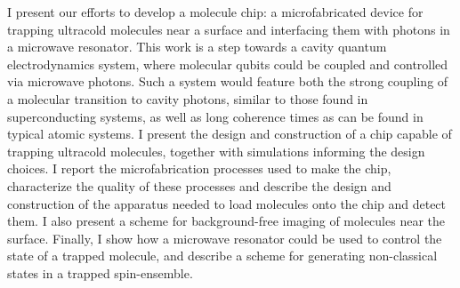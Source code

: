 I present our efforts to develop a molecule chip: a microfabricated device for
trapping ultracold molecules near a surface and interfacing them with photons
in a microwave resonator. This work is a step towards a cavity quantum
electrodynamics system, where molecular qubits could be coupled and controlled
via microwave photons.
%
Such a system would feature both the strong coupling of a molecular transition
to cavity photons, similar to those found in superconducting systems, as well
as long coherence times as can be found in typical atomic systems.
%
I present the design and construction of a chip capable of trapping ultracold
molecules, together with simulations informing the design choices. I report
the microfabrication processes used to make the chip, characterize the quality
of these processes and describe the design and construction of the apparatus
needed to load molecules onto the chip and detect them.
%
I also present a scheme for background-free imaging of molecules near the
surface.  Finally, I show how a microwave resonator could be used to control
the state of a trapped molecule, and describe a scheme for generating
non-classical states in a trapped spin-ensemble.
